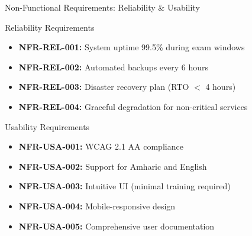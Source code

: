 \begin{frame}{Non-Functional Requirements: Reliability \& Usability}
    \begin{block}{Reliability Requirements}
        \begin{itemize}
            \item \textbf{NFR-REL-001:} System uptime 99.5\% during exam windows
            \item \textbf{NFR-REL-002:} Automated backups every 6 hours
            \item \textbf{NFR-REL-003:} Disaster recovery plan (RTO $<$ 4 hours)
            \item \textbf{NFR-REL-004:} Graceful degradation for non-critical services
        \end{itemize}
    \end{block}
    
    \begin{block}{Usability Requirements}
        \begin{itemize}
            \item \textbf{NFR-USA-001:} WCAG 2.1 AA compliance
            \item \textbf{NFR-USA-002:} Support for Amharic and English
            \item \textbf{NFR-USA-003:} Intuitive UI (minimal training required)
            \item \textbf{NFR-USA-004:} Mobile-responsive design
            \item \textbf{NFR-USA-005:} Comprehensive user documentation
        \end{itemize}
    \end{block}
\end{frame}

